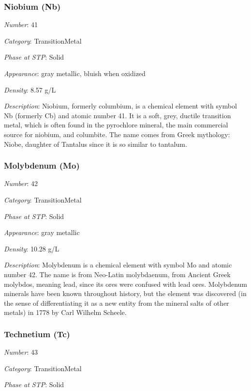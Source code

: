 \documentclass{article}
\begin{document}
\hypertarget{subsubsection::Nb}{}\subsubsection{Niobium (Nb)}

\textit{Number}: 41

\textit{Category}: TransitionMetal

\textit{Phase at STP}: Solid

\textit{Appearance}: gray metallic, bluish when oxidized

\textit{Density}: 8.57 g/L

\textit{Description}: Niobium, formerly columbium, is a chemical element with symbol Nb (formerly Cb) and atomic number 41. It is a soft, grey, ductile transition metal, which is often found in the pyrochlore mineral, the main commercial source for niobium, and columbite. The name comes from Greek mythology: Niobe, daughter of Tantalus since it is so similar to tantalum.

\hypertarget{subsubsection::Mo}{}\subsubsection{Molybdenum (Mo)}

\textit{Number}: 42

\textit{Category}: TransitionMetal

\textit{Phase at STP}: Solid

\textit{Appearance}: gray metallic

\textit{Density}: 10.28 g/L

\textit{Description}: Molybdenum is a chemical element with symbol Mo and atomic number 42. The name is from Neo-Latin molybdaenum, from Ancient Greek molybdos, meaning lead, since its ores were confused with lead ores. Molybdenum minerals have been known throughout history, but the element was discovered (in the sense of differentiating it as a new entity from the mineral salts of other metals) in 1778 by Carl Wilhelm Scheele.

\hypertarget{subsubsection::Tc}{}\subsubsection{Technetium (Tc)}

\textit{Number}: 43

\textit{Category}: TransitionMetal

\textit{Phase at STP}: Solid
\end{document}
